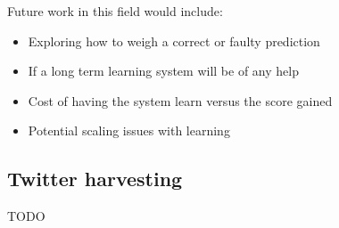 Future work in this field would include:
\begin{itemize}
    \item Exploring how to weigh a correct or faulty prediction
    \item If a long term learning system will be of any help
    \item Cost of having the system learn versus the score gained
    \item Potential scaling issues with learning
\end{itemize}


\subsection{Twitter harvesting}
TODO
